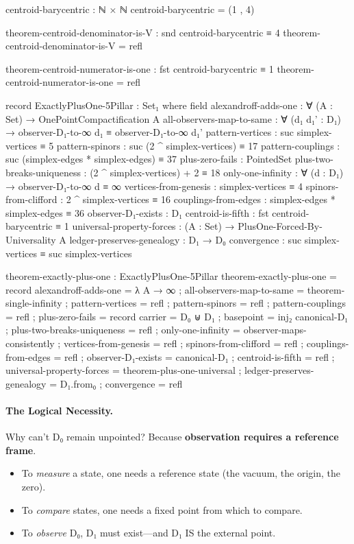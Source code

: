 \documentclass[11pt,a4paper]{book}
\begin{document}
\begin{code}
centroid-barycentric : ℕ × ℕ
centroid-barycentric = (1 , 4)

theorem-centroid-denominator-is-V : snd centroid-barycentric ≡ 4
theorem-centroid-denominator-is-V = refl

theorem-centroid-numerator-is-one : fst centroid-barycentric ≡ 1
theorem-centroid-numerator-is-one = refl

record ExactlyPlusOne-5Pillar : Set₁ where
  field
    alexandroff-adds-one : ∀ (A : Set) → OnePointCompactification A
    all-observers-map-to-same : ∀ (d₁ d₁' : D₁) → 
      observer-D₁-to-∞ d₁ ≡ observer-D₁-to-∞ d₁'
    pattern-vertices : suc simplex-vertices ≡ 5
    pattern-spinors : suc (2 ^ simplex-vertices) ≡ 17
    pattern-couplings : suc (simplex-edges * simplex-edges) ≡ 37
    plus-zero-fails : PointedSet
    plus-two-breaks-uniqueness : (2 ^ simplex-vertices) + 2 ≡ 18
    only-one-infinity : ∀ (d : D₁) → observer-D₁-to-∞ d ≡ ∞
    vertices-from-genesis : simplex-vertices ≡ 4
    spinors-from-clifford : 2 ^ simplex-vertices ≡ 16
    couplings-from-edges : simplex-edges * simplex-edges ≡ 36
    observer-D₁-exists : D₁
    centroid-is-fifth : fst centroid-barycentric ≡ 1
    universal-property-forces : (A : Set) → PlusOne-Forced-By-Universality A
    ledger-preserves-genealogy : D₁ → D₀
    convergence : suc simplex-vertices ≡ suc simplex-vertices

theorem-exactly-plus-one : ExactlyPlusOne-5Pillar
theorem-exactly-plus-one = record
  { alexandroff-adds-one = λ A → ∞
  ; all-observers-map-to-same = theorem-single-infinity
  ; pattern-vertices = refl
  ; pattern-spinors = refl
  ; pattern-couplings = refl
  ; plus-zero-fails = record { carrier = D₀ ⊎ D₁ ; basepoint = inj₂ canonical-D₁ }
  ; plus-two-breaks-uniqueness = refl
  ; only-one-infinity = observer-maps-consistently
   ; vertices-from-genesis = refl
  ; spinors-from-clifford = refl
  ; couplings-from-edges = refl
  ; observer-D₁-exists = canonical-D₁
  ; centroid-is-fifth = refl
  ; universal-property-forces = theorem-plus-one-universal
  ; ledger-preserves-genealogy = D₁.from₀
  ; convergence = refl
  }
\end{code}

\paragraph{The Logical Necessity.}
Why can't D₀ remain unpointed? Because \textbf{observation requires a reference frame}.
\begin{itemize}
\item To \emph{measure} a state, one needs a reference state (the vacuum, the origin, the zero).
\item To \emph{compare} states, one needs a fixed point from which to compare.
\item To \emph{observe} D₀, D₁ must exist---and D₁ IS the external point.
\end{itemize}
\end{document}
